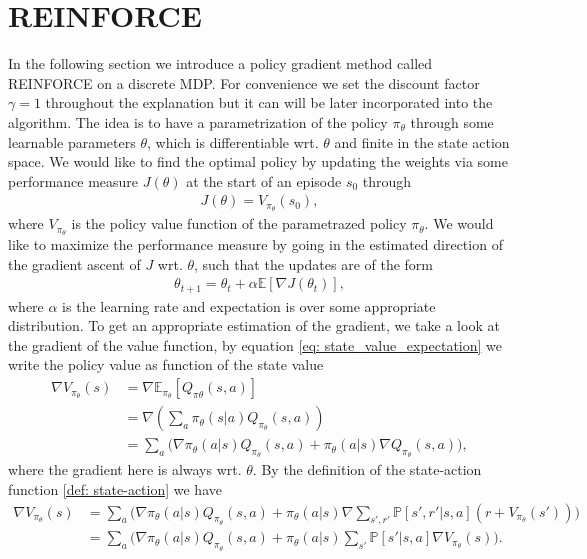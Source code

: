 \section{REINFORCE}
In the following section we introduce a policy gradient method called
REINFORCE \cite[Chapter~13]{sutton_barto} on a discrete MDP. For convenience
we set the discount factor $\gamma=1$ throughout the explanation but it can
will be later incorporated into the algorithm. The idea is to
have a parametrization of the policy $\pi_\theta$ through some learnable
parameters $\theta$, which is differentiable wrt. $\theta$ and finite in the
state action space. We would like to find the optimal policy by updating the
weights via some performance measure $J(\theta)$ at the start of an episode
$s_0$ through
\begin{align}
    J(\theta) = V_{\pi_\theta}(s_0),
\end{align}
where $V_{\pi_\theta}$ is the policy value function of the parametrazed
policy $\pi_\theta$. We would like to maximize the performance measure by
going in the estimated direction of the gradient ascent of $J$ wrt. $\theta$,
such that the updates are of the form
\begin{align}
    \theta_{t+1} = \theta_t + \alpha \mathbb{E}[\nabla J(\theta_t)],
\end{align}
where $\alpha$ is the learning rate and expectation is over some appropriate
distribution. To get an appropriate estimation of the gradient, we take a
look at the gradient of the value function, by equation
\ref{eq: state_value_expectation} we write the policy value as function of the state value
\begin{align}
    \nabla V_{\pi_\theta}(s)
    &= \nabla \mathbb{E}_{\pi_\theta}
    \left[
        Q_{\pi\theta}(s, a)
    \right] \\
    &= \nabla \left(
        \sum_{a}\pi_\theta(s|a) Q_{\pi_\theta}(s, a)
    \right) \\
    &= \sum_{a} \Big(
        \nabla \pi_\theta(a|s)Q_{\pi_\theta}(s,a) + \pi_\theta(a|s)\nabla
        Q_{\pi_\theta}(s, a)
    \Big),
\end{align}
where the gradient here is always wrt. $\theta$. By the definition of the
state-action function \ref{def: state-action} we have
\begin{align}
    \nabla V_{\pi_\theta}(s)
    &= \sum_{a} \Big(
        \nabla \pi_\theta(a|s)Q_{\pi_\theta}(s,a) + \pi_\theta(a|s)\nabla
        \sum_{s',r'} \mathbb{P}[s', r'|s, a]\left( r+V_{\pi_\theta}(s') \right)
    \Big)\\
    &= \sum_{a} \Big(
        \nabla \pi_\theta(a|s)Q_{\pi_\theta}(s,a) + \pi_\theta(a|s)
        \sum_{s'} \mathbb{P}[s'|s, a]
        \nabla V_{\pi_\theta}(s)
    \Big).
\end{align}

